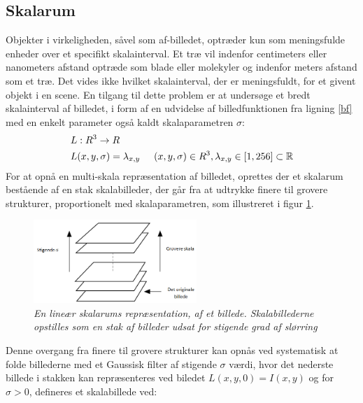 \subsection{Skalarum}
\label{sec:scale}
Objekter i virkeligheden, såvel som  af-billedet, optræder kun som meningsfulde enheder over et specifikt skalainterval. Et træ vil indenfor centimeters eller nanometers afstand optræde som blade eller molekyler og indenfor meters afstand som et træ. Det vides ikke hvilket skalainterval, der er meningsfuldt, for et givent objekt i en scene.  En tilgang til dette problem er at undersøge et bredt skalainterval af billedet, i form af en udvidelse af billedfunktionen fra ligning \eqref{bf} med en enkelt parameter også kaldt skalaparametren $\sigma$:
\begin{equation}
\begin{split}
&L: R^3 \rightarrow R \\
&L(x,y,\sigma) = \lambda_{x,y} \hspace{0.5 cm} (x,y,\sigma)\in R^3, \lambda_{x,y} \in [1,256] \subset \mathbb{R}
\end{split}
\end{equation}
For at opnå en multi-skala repræsentation af billedet, oprettes der et skalarum bestående af en stak skalabilleder, der går fra at udtrykke finere til grovere strukturer, proportionelt med skalaparametren, som illustreret i figur \ref{fig:scalerep}. 
\begin{figure}[H]
    \centering
    \includegraphics[width=0.55\textwidth]{fig/32.png}
     \vspace{-0.5em}
    \begin{center}    
       \caption{{\footnotesize \textit{En lineær skalarums repræsentation, af et billede. Skalabillederne opstilles som en stak af billeder udsat for stigende grad af slørring}}}
    \label{fig:scalerep}
     \end{center}
     \vspace{-2.5em}
  \end{figure} \noindent
Denne overgang fra finere til grovere strukturer kan opnås ved systematisk at folde billederne med et Gaussisk filter af stigende $\sigma$ værdi, hvor det nederste billede i stakken kan repræsenteres ved biledet $ L(x,y,0) = I(x,y)$ og for $\sigma>0$, defineres et skalabillede ved:
